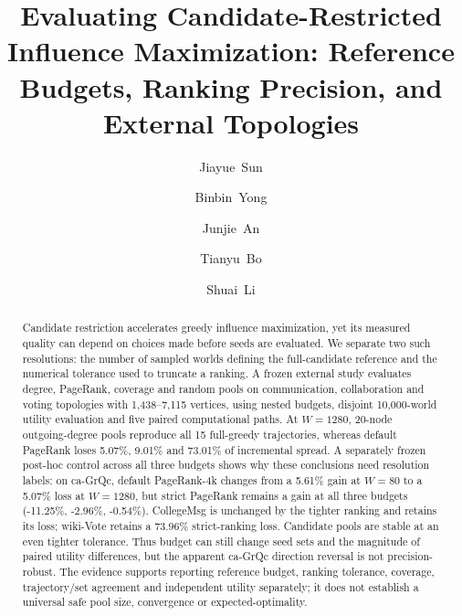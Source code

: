 \documentclass[smallextended]{svjour3}
\begin{document}
\title{Evaluating Candidate-Restricted Influence Maximization: Reference Budgets, Ranking Precision, and External Topologies}
\author{\mbox{Jiayue Sun} \and \mbox{Binbin Yong} \and \mbox{Junjie An} \and \mbox{Tianyu Bo} \and \mbox{Shuai Li}}
\date{}
\maketitle
\begin{abstract}
Candidate restriction accelerates greedy influence maximization, yet its measured quality can depend on choices made before seeds are evaluated. We separate two such resolutions: the number of sampled worlds defining the full-candidate reference and the numerical tolerance used to truncate a ranking. A frozen external study evaluates degree, PageRank, coverage and random pools on communication, collaboration and voting topologies with 1,438--7,115 vertices, using nested budgets, disjoint 10,000-world utility evaluation and five paired computational paths. At $W=1280$, 20-node outgoing-degree pools reproduce all 15 full-greedy trajectories, whereas default PageRank loses 5.07\%, 9.01\% and 73.01\% of incremental spread. A separately frozen post-hoc control across all three budgets shows why these conclusions need resolution labels: on ca-GrQc, default PageRank-4k changes from a 5.61\% gain at $W=80$ to a 5.07\% loss at $W=1280$, but strict PageRank remains a gain at all three budgets (-11.25\%, -2.96\%, -0.54\%). CollegeMsg is unchanged by the tighter ranking and retains its loss; wiki-Vote retains a 73.96\% strict-ranking loss. Candidate pools are stable at an even tighter tolerance. Thus budget can still change seed sets and the magnitude of paired utility differences, but the apparent ca-GrQc direction reversal is not precision-robust. The evidence supports reporting reference budget, ranking tolerance, coverage, trajectory/set agreement and independent utility separately; it does not establish a universal safe pool size, convergence or expected-optimality.
\end{abstract}
\end{document}
